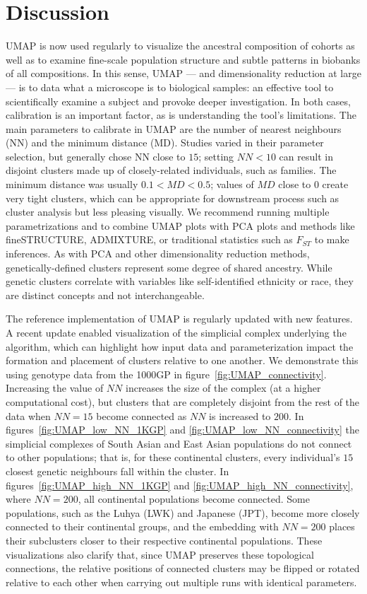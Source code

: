 \documentclass[12pt]{article}
\begin{document}
\section*{Discussion}
UMAP is now used regularly to visualize the ancestral composition of cohorts as well as to examine fine-scale population structure and subtle patterns in biobanks of all compositions. In this sense, UMAP --- and dimensionality reduction at large --- is to data what a microscope is to biological samples: an effective tool to scientifically examine a subject and provoke deeper investigation. In both cases, calibration is an important factor, as is understanding the tool's limitations. The main parameters to calibrate in UMAP are the number of nearest neighbours (NN) and the minimum distance (MD). Studies varied in their parameter selection, but generally chose NN close to $15$; setting $NN < 10$ can result in disjoint clusters made up of closely-related individuals, such as families. The minimum distance was usually $0.1 < MD < 0.5$; values of $MD$ close to $0$ create very tight clusters, which can be appropriate for  downstream process such as cluster analysis but less pleasing visually. We recommend running multiple parametrizations and to combine UMAP plots with PCA plots and methods like fineSTRUCTURE\cite{lawson2012inference}, ADMIXTURE\cite{alexander2009fast}, or traditional statistics such as $F_{ST}$ to make inferences. As with PCA and other dimensionality reduction methods, genetically-defined clusters represent some degree of shared ancestry. While genetic clusters correlate with variables like self-identified ethnicity or race, they are distinct concepts and not interchangeable\cite{mathieson2020ancestry}.

The reference implementation of UMAP is regularly updated with new features\cite{mcinnes2018software}. A recent update enabled visualization of the simplicial complex underlying the algorithm, which can highlight how input data and parameterization impact the formation and placement of clusters relative to one another. We demonstrate this using genotype data from the 1000GP in figure~\ref{fig:UMAP_connectivity}. Increasing the value of $NN$ increases the size of the complex (at a higher computational cost), but clusters that are completely disjoint from the rest of the data when $NN=15$ become connected as $NN$ is increased to $200$. In figures~\ref{fig:UMAP_low_NN_1KGP} and \ref{fig:UMAP_low_NN_connectivity} the simplicial complexes of South Asian and East Asian populations do not connect to other populations; that is, for these continental clusters, every individual's $15$ closest genetic neighbours fall within the cluster. In figures~\ref{fig:UMAP_high_NN_1KGP} and \ref{fig:UMAP_high_NN_connectivity}, where $NN=200$, all continental populations become connected. Some populations, such as the Luhya (LWK) and Japanese (JPT), become more closely connected to their continental groups, and the embedding with $NN=200$ places their subclusters closer to their respective continental populations. These visualizations also clarify that, since UMAP preserves these topological connections, the relative positions of connected clusters may be flipped or rotated relative to each other when carrying out multiple runs with identical parameters.
\end{document}
